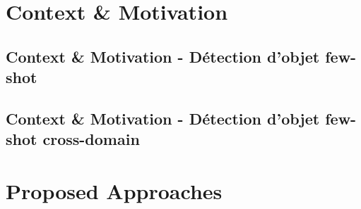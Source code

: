 \documentclass[xcolor=table, 8pt]{beamer}
\begin{document}
    \maketitle
    


    \section{Context \& Motivation}\label{sec:od-fsod}

    \subsection{Context \& Motivation - Détection d'objet few-shot}\label{subsec:few-shot-object-detection}
    
    

    \subsection{Context \& Motivation - Détection d'objet few-shot cross-domain}\label{subsec:cd-fsod}
    

    
    
    
    
    
    
    

    \section{Proposed Approaches}

%     
\end{document}
